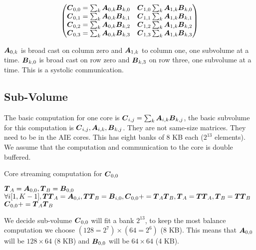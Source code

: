 \documentclass[conference]{IEEEtran}
\begin{document}
{\small \begin{equation}
  \label{eq:gemm-fatc}
  \begin{pmatrix}
    \Vc{C}_{0,0} = \sum_k \Vc{A}_{0,k}\Vc{B}_{k,0} & \Vc{C}_{1,0} \sum_k \Vc{A}_{1,k}\Vc{B}_{k,0}\\
    \Vc{C}_{0,1} = \sum_k \Vc{A}_{0,k}\Vc{B}_{k,1} & \Vc{C}_{1,1} \sum_k \Vc{A}_{1,k}\Vc{B}_{k,1}\\
    \Vc{C}_{0,2} = \sum_k \Vc{A}_{0,k}\Vc{B}_{k,2} & \Vc{C}_{1,2} \sum_k \Vc{A}_{1,k}\Vc{B}_{k,2}\\
    \Vc{C}_{0,3} = \sum_k \Vc{A}_{0,k}\Vc{B}_{k,3} & \Vc{C}_{1,3} \sum_k \Vc{A}_{1,k}\Vc{B}_{k,3}\\
  \end{pmatrix}  
\end{equation}
}

${\boldsymbol A}_{0,k}$ is broad cast on column zero and ${\boldsymbol A}_{1,k}$ to
column one, one subvolume at a time. ${\boldsymbol B}_{k,0}$ is broad cast on
row zero and ${\boldsymbol B}_{k,3}$ on row three, one subvolume at a
time. This is a systolic communication.

\subsection{Sub-Volume}
The basic computation for one core is ${\boldsymbol C}_{i,j} = \sum_k
{\boldsymbol A}_{i,k}{\boldsymbol B}_{k,j}$, the basic subvolume for this computation is
${\boldsymbol C}_{i,j}, {\boldsymbol A}_{i,k},{\boldsymbol B}_{k,j}$. They are not same-size matrices. They need to be in the AIE cores. This has eight banks of 8
KB each ($2^{13}$ elements).  We assume that the computation and
communication to the core is double buffered.
\begin{algorithm}
  \caption{Core streaming computation for ${\boldsymbol C}_{0,0}$}
  \label{alg:one}
  \begin{algorithmic}[1]
    \STATE ${\boldsymbol T}_A = {\boldsymbol A}_{0,0}, {\boldsymbol T}_B = {\boldsymbol B}_{0,0}$ 
    \STATE $\forall i [1,K-1], {\boldsymbol {TT}}_A = {\boldsymbol A}_{0,i} , {\boldsymbol {TT}}_B = {\boldsymbol B}_{i,0},    {\boldsymbol C}_{0,0} += {\boldsymbol T}_{A}{\boldsymbol T}_{B}, {\boldsymbol T}_A = {\boldsymbol {TT}}_{A} , {\boldsymbol T}_B = {\boldsymbol {TT}}_B$ 
    \STATE ${\boldsymbol C}_{0,0} += {\boldsymbol T}_{A}{\boldsymbol T}_{B}$ 
  \end{algorithmic}  
\end{algorithm}

We decide sub-volume ${\boldsymbol C}_{0,0}$ will fit a bank $2^{13}$, to keep
the most balance computation we choose $(128=2^7) \times (64=2^6)$ (8
KB). This means that ${\boldsymbol A}_{0,0}$ will be $128 \times 64$ (8 KB) and
${\boldsymbol B}_{0,0}$ will be $64 \times 64$ (4 KB).
\end{document}

